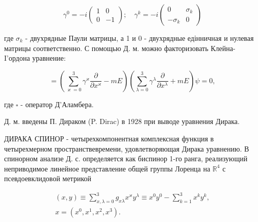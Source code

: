 \documentclass[10pt]{article}
\begin{document}
\[

\gamma^{0}=-i\left(\begin{array}{rr}

1 & 0 \\

0 & -1

\end{array}\right) ; \quad \gamma^{k}=-i\left(\begin{array}{rr}

0 & \sigma_{k} \\

-\sigma_{k} & 0

\end{array}\right)

\]



где $\sigma_{k}$ - двухрядные Паули матрицы, а 1 и 0 - двухрядные едінничная и нулевая матрицы соответственно. С помощью Д. м. можно факторизовать Клейна- I'ордона уравнение:



\[

=\left(\sum_{\varkappa=0}^{3} \gamma^{\varkappa} \frac{\partial}{\partial x^{\varkappa}}-m E\right)\left(\sum_{\lambda=0}^{3} \gamma^{\lambda} \frac{\partial}{\partial x^{\lambda}}+m E\right) \psi=0,

\]



где $\square$ - оператор Д'Аламбера.



Д. м. введены П. Дираком (P. Dirac) в 1928 при выводе уравнения Дирака.



ДИРАКА СПИНОР - четырехкомпонентная комплексная функция в четырехмерном пространствевремени, удовлетворяющая Дирака уравнению. В спинорном анализе Д. с. определяется как биспинор 1-го ранга, реализующий неприводимое линейное представление общей группы Лоренца на $\mathbb{R}^{4}$ с псевдоевклидовой метрикой



\[

\begin{gathered}

(x, y) \equiv \sum_{x, \lambda=0}^{3} g_{x \lambda} x^{\varkappa} y^{\lambda} \equiv x^{0} y^{0}-\sum_{k=1}^{3} x^{k} y^{k}, \\

x=\left(x^{0}, x^{1}, x^{2}, x^{3}\right) .

\end{gathered}

\]
\end{document}
